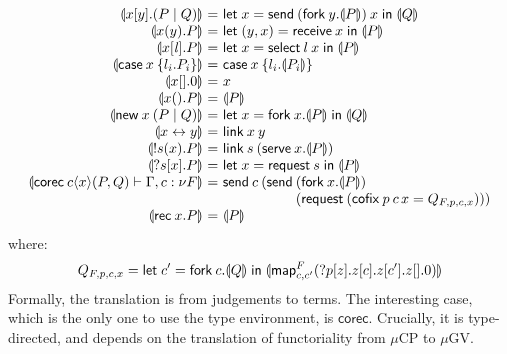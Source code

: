 \documentclass[orivec,envcountsame]{llncs}
\makeatletter
\newcommand{\cptyp}[2]{#1 \vdash #2}
\newcommand{\mapname}{\mathsf{map}}
\newcommand{\map}[3]{\mapname^{#1}_{#2}(#3)}
\newcommand{\gvmap}[3]{\mapname^{#1}_{#2}\:#3}
\newcommand{\mkwd}[1]{\mathsf{#1}}
\newcommand{\link}[2]{#1 \leftrightarrow #2}
\newcommand{\cut}[4]{\mkwd{new}\:#1 \: (#3 \mid #4)}
\newcommand{\replicate}[2]{{!#1(#2)}}
\newcommand{\derelict}[2]{{?#1[#2]}}
\newcommand{\rec}[1]{\mkwd{rec}\:#1}
\newcommand{\corec}[5]{\mkwd{corec}\:#1 \langle #2 \rangle (#4,#5)}
\newcommand{\clabel}[1]{\mathit{#1}}
\renewcommand{\case}[2]{\mkwd{case}\:#1\:\{#2\}}
\newcommand{\sel}[2]{#1[\clabel{#2}]}
\newcommand{\gvsend}[2]{\mkwd{send}\:#1\:#2}
\newcommand{\gvreceive}[1]{\mkwd{receive}\:#1}
\newcommand{\gvlet}[3]{\mkwd{let}\;#1 = #2\;\mkwd{in}\;#3}
\newcommand{\gvselect}[2]{\mkwd{select}\:#1\:#2}
\newcommand{\gvcase}[2]{\mkwd{case}\:#1\:\{#2\}}
\newcommand{\gvlink}[2]{\mkwd{link}\:#1\:#2}
\newcommand{\gvfork}[2]{\mkwd{fork}\:#1.#2}
\newcommand{\lrkwd}{\mkwd{cofix}}
\newcommand{\gvfix}[3]{\lrkwd\:#1\:#2 = #3}
\newcommand{\gvserve}[2]{\mkwd{serve}\:#1.#2}
\newcommand{\gvrequest}[1]{\mkwd{request}\:#1}
\newcommand{\key}{\mkwd}
\newcommand{\togv}[1]{\llparenthesis #1 \rrparenthesis}
\newcommand{\mucp}{$\mu\mathrm{CP}$\xspace}
\newcommand{\mugv}{$\mu\mathrm{GV}$\xspace}
\newcommand{\ba}{\begin{array}}
\newcommand{\ea}{\end{array}}
\newcommand{\bl}{\ba[t]{@{}l@{}}}
\newcommand{\el}{\ea}
\newenvironment{equations}{\[\ba{@{}r@{~}c@{~}l@{}}}{\ea\]}
\makeatother
\begin{document}
\begin{equations}
\small
  \togv{x[y].(P \mid Q)} &=&
    \gvlet{x}{\gvsend{(\gvfork{y}{\togv{P}})}{x}}{\togv{Q}} \\
  \togv{x(y).P} &=&
    \gvlet{(y,x)}{\gvreceive{x}}{\togv{P}} \\
  \togv{\sel{x}{\mathit{l}}.P} &=&
    \gvlet{x}{\gvselect{l}{x}}{\togv{P}} \\
  \togv{\case{x}{l_i.P_i}} &=&
    \gvcase{x}{l_i.\togv{P_i}} \\
  \togv{x[].0} &=& x \\
  \togv{x().P} &=& \togv{P} \\
  \togv{\cut{x}{}{P}{Q}} &=&
    \gvlet{x}{\gvfork{x}{\togv{P}}}{\togv{Q}} \\
  \togv{\link{x}{y}} &=& \gvlink{x}{y} \\
  \togv{\replicate{s}{x}.P} &=&
    \gvlink{s}{(\gvserve{x}{\togv{P}})} \\
  \togv{\derelict{s}{x}.P} &=&
    \gvlet{x}{\gvrequest{s}}{\togv{P}} \\
  \togv{\cptyp{\corec{c}{x}{}{P}{Q}}{\Gamma, c:\nu F}} &=&
    \key{send}\:c\:(
      \key{send}\:
         \bl
         (\gvfork{x}{\togv{P}}) \\
         (\gvrequest{(\gvfix{p}{c\,x}{Q_{F,p,c,x}})})) \\
         \el \\
  \togv{\rec{x}.P} &=& \togv{P} \\
\end{equations}%
where:
%
\[\small
  Q_{F,p,c,x} =
    \gvlet{c'}{\gvfork{c}{\togv{Q}}}
          {\togv{\map{F}{c,c'}{\derelict{p}{z}.z[c].z[c'].z[].0}}}
\]%
Formally, the translation is from judgements to terms. The interesting case, which is the only one
to use the type environment, is $\key{corec}$. Crucially, it is type-directed, and depends on the
translation of functoriality from \mucp to \mugv.



\end{document}
